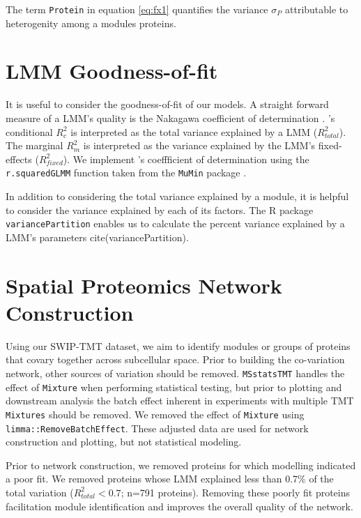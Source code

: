\documentclass[11pt]{elife}\usepackage[]{graphicx}\usepackage[]{color}
\begin{document}
The term \texttt{Protein} in equation \ref{eq:fx1} quantifies the variance
$\sigma_P$ attributable to heterogenity among a modules proteins.


\section{LMM Goodness-of-fit}

It is useful to consider the goodness-of-fit of our models. A straight forward
measure of a LMM's quality is the Nakagawa coefficient of 
determination \citep{Nakagawa2012}. \cite{Nakagawa2012}'s conditional $R^2_c$ is 
interpreted as the total variance explained by a LMM ($R^2_{total}$).
The marginal $R^2_m$ is interpreted as the variance explained by the LMM's 
fixed-effects ($R^2_{fixed}$). We implement \cite{Nakagawa2012}'s coeffficient of 
determination using the \texttt{r.squaredGLMM} function taken from the 
\texttt{MuMin} package \citep{WangMerkle2018}. 

In addition to considering the total variance explained by a module, it is
helpful to consider the variance explained by each of its factors.
The R package \texttt{variancePartition} enables us to
calculate the percent variance explained by a LMM's parameters
cite(variancePartition). 


\section{Spatial Proteomics Network Construction}

Using our SWIP-TMT dataset, we aim to identify modules or groups of proteins
that covary together across subcellular space. Prior to building the
co-variation network, other sources of variation should be removed.
\texttt{MSstatsTMT} handles the effect of \texttt{Mixture} when performing
statistical testing,  but prior to plotting and downstream analysis the batch
effect inherent in experiments with multiple TMT \texttt{Mixtures} should be
removed.  We removed the effect of \texttt{Mixture} using
\texttt{limma::RemoveBatchEffect}. These adjusted data are used for network
construction and plotting, but not statistical modeling.

Prior to network construction, we removed proteins for which modelling indicated
a poor fit. We removed proteins whose LMM explained less than 0.7\% of the total
variation ($R^2_{total}<0.7$; n=791 proteins). Removing these poorly fit proteins facilitation
module identification and improves the overall quality of the network.
\end{document}

